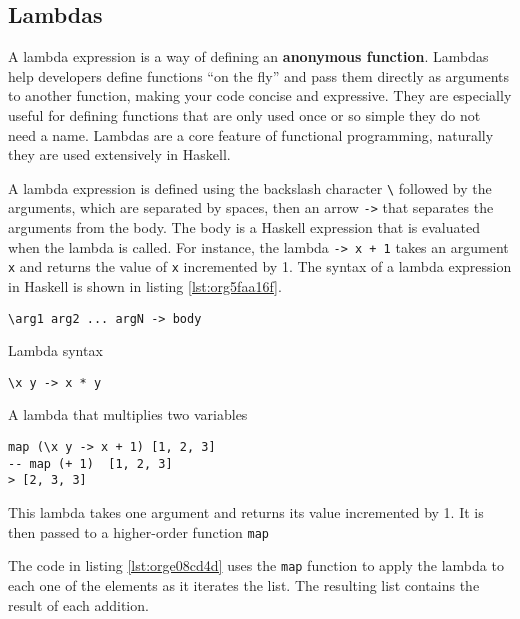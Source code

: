 \documentclass[a4paper, titlepage, twoside]{article}
\begin{document}
\subsection{Lambdas}
\label{sec:org7d30e43}

A lambda expression is a way of defining an \textbf{anonymous function}. Lambdas help developers define functions ``on the fly'' and pass them directly as arguments to another function, making your code concise and expressive. They are especially useful for defining functions that are only used once or so simple they do not need a name. Lambdas are a core feature of functional programming, naturally they are used extensively in Haskell.

A lambda expression is defined using the backslash character \texttt{\textbackslash{}} followed by the arguments, which are separated by spaces, then an arrow \texttt{->} that separates the arguments from the body. The body is a Haskell expression that is evaluated when the lambda is called. For instance, the lambda \texttt{\x -> x + 1} takes an argument \texttt{x} and returns the value of \texttt{x} incremented by 1. The syntax of a lambda expression in Haskell is shown in listing \ref{lst:org5faa16f}.

\begin{listing}[htbp]
\begin{verbatim}
\arg1 arg2 ... argN -> body
\end{verbatim}
\caption{\label{lst:org5faa16f}Lambda syntax}
\end{listing}

\begin{listing}[htbp]
\begin{verbatim}
\x y -> x * y
\end{verbatim}
\caption{A lambda that multiplies two variables}
\end{listing}

\begin{listing}[htbp]
\begin{verbatim}
map (\x y -> x + 1) [1, 2, 3]
-- map (+ 1)  [1, 2, 3]
> [2, 3, 3]
\end{verbatim}
\caption[higher-order lambda]{\label{lst:orge08cd4d}This lambda takes one argument and returns its value incremented by 1. It is then passed to a higher-order function \texttt{map}}
\end{listing}

The code in listing \ref{lst:orge08cd4d} uses the \texttt{map} function to apply the lambda to each one of the elements as it iterates the list. The resulting list contains the result of each addition.
\end{document}
